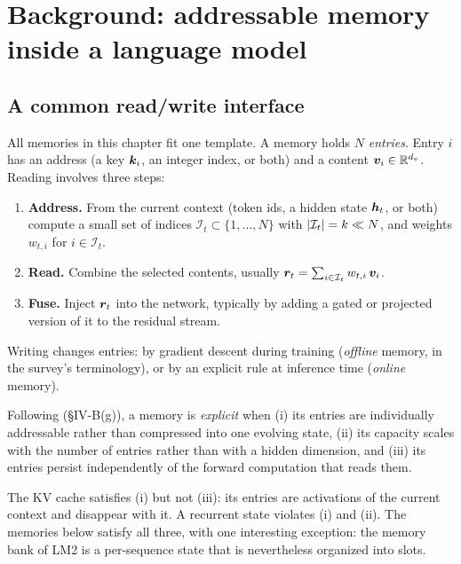 \section{Background: addressable memory inside a language model}\label{sec:c10-background}

\subsection{A common read/write interface}\label{sec:c10-interface}

All memories in this chapter fit one template. A memory holds $N$ \emph{entries}. Entry $i$ has an
address (a key $\bm{k}_i$, an integer index, or both) and a content $\bm{v}_i \in \mathbb{R}^{d_v}$. Reading
involves three steps:
\begin{enumerate}
  \item \textbf{Address.} From the current context (token ids, a hidden state $\bm{h}_t$, or both)
        compute a small set of indices $\mathcal{I}_t \subset \{1,\dots,N\}$ with
        $\left\lvert \mathcal{I}_t\right\rvert = k \ll N$, and weights $w_{t,i}$ for $i \in \mathcal{I}_t$.
  \item \textbf{Read.} Combine the selected contents, usually
        $\bm{r}_t = \sum_{i \in \mathcal{I}_t} w_{t,i}\, \bm{v}_i$.
  \item \textbf{Fuse.} Inject $\bm{r}_t$ into the network, typically by adding a gated or projected
        version of it to the residual stream.
\end{enumerate}
Writing changes entries: by gradient descent during training (\emph{offline} memory, in the
survey's terminology), or by an explicit rule at inference time (\emph{online} memory).

\begin{definition}\label{def:c10-explicit}
Following \citet{zhoubian2026memory} (\S IV-B(g)), a memory is \emph{explicit} when (i) its entries
are individually addressable rather than compressed into one evolving state, (ii) its capacity
scales with the number of entries rather than with a hidden dimension, and (iii) its entries
persist independently of the forward computation that reads them.
\end{definition}

The KV cache satisfies (i) but not (iii): its entries are activations of the current context and
disappear with it. A recurrent state violates (i) and (ii). The memories below satisfy all three,
with one interesting exception: the memory bank of LM2 is a per-sequence state that is
nevertheless organized into slots.

